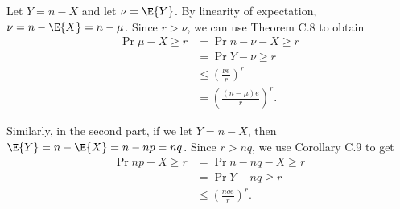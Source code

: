 \starred
Let $Y=n-X$ and let $\nu=\E{Y}$.
By linearity of expectation, $\nu=n-\E{X}=n-\mu$.
Since $r>\nu$, we can use Theorem C.8 to obtain
\begin{align*}
    \Pr{\mu-X\ge r} &= \Pr{n-\nu-X\ge r} \\
    &= \Pr{Y-\nu\ge r} \\
    &\le \left(\frac{\nu e}{r}\right)^r \\
    &= \left(\frac{(n-\mu)e}{r}\right)^r.
\end{align*}

Similarly, in the second part, if we let $Y=n-X$, then $\E{Y}=n-\E{X}=n-np=nq$.
Since $r>nq$, we use Corollary C.9 to get
\begin{align*}
    \Pr{np-X\ge r} &= \Pr{n-nq-X\ge r} \\
    &= \Pr{Y-nq\ge r} \\
    &\le \left(\frac{nqe}{r}\right)^r.
\end{align*}
